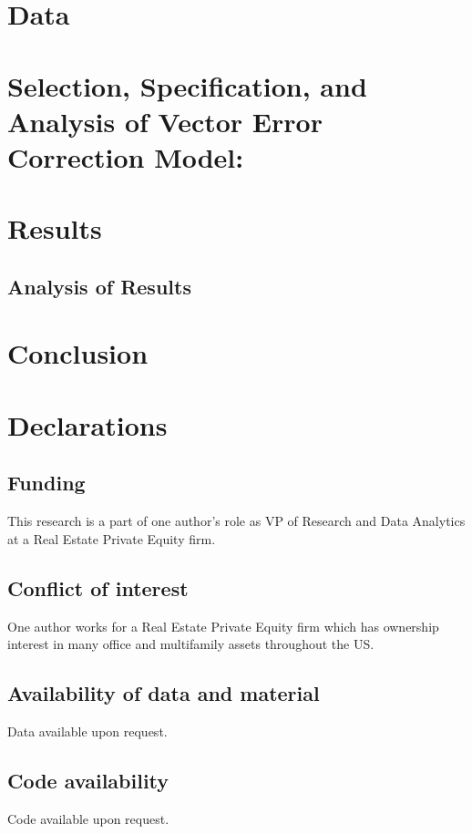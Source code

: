 \section{Data}

 
\section{Selection, Specification, and Analysis of Vector Error Correction Model:}
 
\section{Results}

\subsection{Analysis of Results}


\section{Conclusion}

\pagebreak


%
\section*{Declarations}
\subsection{Funding}
This research is a part of one author's role as VP of Research and Data Analytics at a Real Estate Private Equity firm. 

\subsection{Conflict of interest}
One author works for a Real Estate Private Equity firm which has ownership interest in many office and multifamily assets throughout the US. 

\subsection{Availability of data and material}
Data available upon request.

\subsection{Code availability}
Code available upon request.

